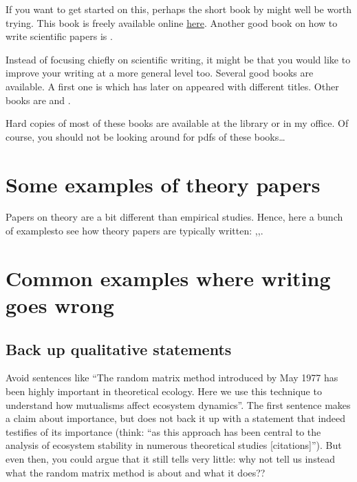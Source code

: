 \documentclass[
]{book}
\begin{document}
If you want to get started on this, perhaps the short book by \citet{Mack2018} might well be worth trying. This book
is freely available online \href{https://spie.org/Publications/Book/2317706?SSO=1}{here}. Another good book on how to write scientific papers is \citet{Gastel2022}.

Instead of focusing chiefly on scientific writing, it might be that you would like to improve your writing at a more general level too. Several good books are available. A first one is \citet{Williams1990} which has later on appeared
with different titles. Other books are \citet{Pinker2014} and \citet{Zinsser2006}.

Hard copies of most of these books are available at the library or in my office. Of course, you should not be looking around for pdfs of these books\ldots{}

\hypertarget{some-examples-of-theory-papers}{%
\section{Some examples of theory papers}\label{some-examples-of-theory-papers}}

Papers on theory are a bit different than empirical studies. Hence, here a bunch of examplesto see how theory papers are typically written: \citep{Fawcett2007},\citep{Trimmer2015},\citep{Kahn2015}.

\hypertarget{common-examples-where-writing-goes-wrong}{%
\section{Common examples where writing goes wrong}\label{common-examples-where-writing-goes-wrong}}

\hypertarget{back-up-qualitative-statements}{%
\subsection{Back up qualitative statements}\label{back-up-qualitative-statements}}

Avoid sentences like ``The random matrix method introduced by May 1977 has been highly important in theoretical ecology. Here we use this technique to understand how mutualisms affect ecosystem dynamics''. The first sentence makes a claim about importance, but does not back it up with a statement that indeed testifies of its importance (think: ``as this approach has been central to the analysis of ecosystem stability in numerous theoretical studies {[}citations{]}''). But even then, you could argue that it still tells very little: why not tell us instead what the random matrix method is about and what it does??
\end{document}
